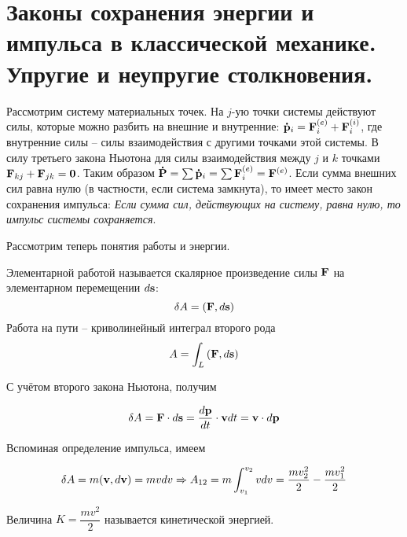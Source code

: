 \section{Законы сохранения энергии и импульса в классической механике. Упругие и неупругие столкновения.}

Рассмотрим систему материальных точек. На $j$-ую точки системы действуют силы, которые можно разбить на внешние и внутренние: $\mathbf{\dot p}_i = \mathbf F_i^{(e)} + \mathbf F_i^{(i)}$, где внутренние силы -- силы взаимодействия с другими точками этой системы. В силу третьего закона Ньютона для силы взаимодействия между $j$ и $k$ точками $\mathbf F_{kj} + \mathbf F_{jk} = \mathbf 0$. Таким образом $\mathbf{\dot P} = \sum \mathbf{\dot p}_i = \sum \mathbf F_i^{(e)} = \mathbf F^{(e)}$. Если сумма внешних сил равна нулю (в частности, если система замкнута), то имеет место закон сохранения импульса: \textit{Если сумма сил, действующих на систему, равна нулю, то импульс системы сохраняется}.

Рассмотрим теперь понятия работы и энергии.

\begin{definition}
    Элементарной работой называется скалярное произведение силы $\mathbf F$ на элементарном перемещении $d \mathbf s$:
    \begin{equation} \label{eq:элементарная работа}
        \delta A = \left( \mathbf F, d \mathbf s \right)
    \end{equation}
    Работа на пути -- криволинейный интеграл второго рода 
    \begin{equation} \label{eq:работа на пути}
        A = \int_L \left( \mathbf F, d \mathbf s \right)
    \end{equation}
\end{definition}

\noindent
С учётом второго закона Ньютона, получим

\begin{equation}
    \delta A = \mathbf F \cdot d \mathbf s = \frac{d \mathbf p}{dt} \cdot \mathbf v dt = \mathbf v \cdot d \mathbf p
\end{equation}

\noindent
Вспоминая определение импульса, имеем

\begin{equation}
    \delta A = m (\mathbf v, d \mathbf v) = m v dv \Rightarrow A_{12} = m \int_{v_1}^{v_2} vdv = \frac{m v_2^2}{2} - \frac{m v_1^2}{2}
\end{equation}

\begin{definition}
    Величина $K = \dfrac{m v^2}{2}$ называется кинетической энергией.
\end{definition}

